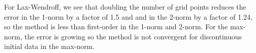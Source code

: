 \documentclass[12pt]{article}
\begin{document}

For Lax-Wendroff, we see that doubling the number of grid points reduces the error in the 1-norm by a factor of 1.5 and and in the 2-norm by a factor of 1.24, so the method is less than first-order in the 1-norm and 2-norm.  For the max-norm, the error is growing so the method is not convergent for discontinuous initial data in the max-norm.
\end{document}
